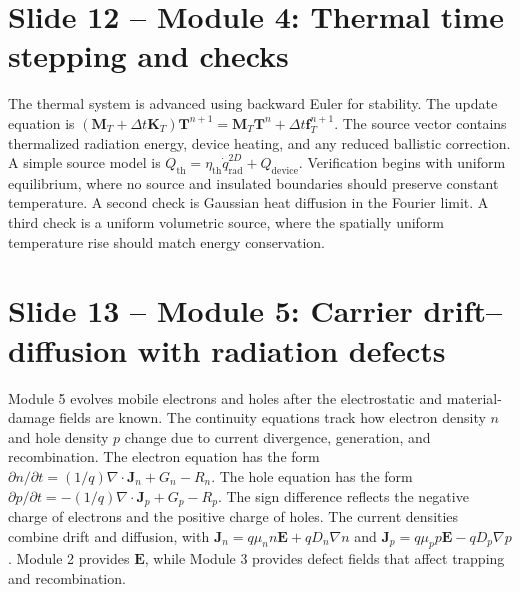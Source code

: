 \documentclass[11pt]{article}
\newcommand{\grad}{\nabla}
\newcommand{\divg}{\nabla\!\cdot}
\newcommand{\E}{\bm{E}}
\newcommand{\J}{\bm{J}}
\newcommand{\mat}[1]{\mathbf{#1}}
\newcommand{\vect}[1]{\bm{#1}}
\begin{document}
\section*{Slide 12 -- Module 4: Thermal time stepping and checks}
\begin{scriptbox}
The thermal system is advanced using backward Euler for stability. The update equation is \((\mat{M}_T+\Delta t\mat{K}_T)\vect{T}^{n+1}=\mat{M}_T\vect{T}^n+\Delta t\vect{f}_T^{n+1}\). The source vector contains thermalized radiation energy, device heating, and any reduced ballistic correction. A simple source model is \(Q_{\mathrm{th}}=\eta_{\mathrm{th}}\dot{q}_{\mathrm{rad}}^{2D}+Q_{\mathrm{device}}\). Verification begins with uniform equilibrium, where no source and insulated boundaries should preserve constant temperature. A second check is Gaussian heat diffusion in the Fourier limit. A third check is a uniform volumetric source, where the spatially uniform temperature rise should match energy conservation.
\end{scriptbox}

\section*{Slide 13 -- Module 5: Carrier drift--diffusion with radiation defects}
\begin{scriptbox}
Module 5 evolves mobile electrons and holes after the electrostatic and material-damage fields are known. The continuity equations track how electron density \(n\) and hole density \(p\) change due to current divergence, generation, and recombination. The electron equation has the form \(\partial n/\partial t=(1/q)\divg\J_n+G_n-R_n\). The hole equation has the form \(\partial p/\partial t=-(1/q)\divg\J_p+G_p-R_p\). The sign difference reflects the negative charge of electrons and the positive charge of holes. The current densities combine drift and diffusion, with \(\J_n=q\mu_nn\E+qD_n\grad n\) and \(\J_p=q\mu_pp\E-qD_p\grad p\). Module 2 provides \(\E\), while Module 3 provides defect fields that affect trapping and recombination.
\end{scriptbox}
\end{document}
